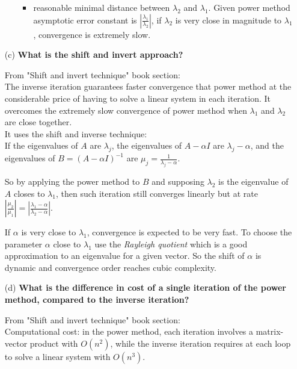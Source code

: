 \documentclass[unicode,11pt,a4paper,oneside,numbers=endperiod,openany]{scrartcl}
\begin{document}
\begin{enumerate}
\begin{itemize}
\begin{itemize}
                      \item
                            reasonable minimal distance between $\lambda_2$ and $\lambda_1$.
                            Given power method asymptotic error constant is $|\frac{\lambda_1}{\lambda_2}|$,
                            if $\lambda_2$ is very close in magnitude to $\lambda_1$, convergence is extremely slow.
                  \end{itemize}
        \end{itemize}

    \item[(c)] \textbf{What is the shift and invert approach?}

        From "Shift and invert technique" book section: \\
        The inverse iteration guarantees faster convergence that power method at the considerable price of having to solve a linear system in each iteration.
        It overcomes the extremely slow convergence of power method when $\lambda_1$ and $\lambda_2$ are close together. \\

        It uses the shift and inverse technique: \\
        If the eigenvalues of $A$ are $\lambda_j$, the eigenvalues of $A - \alpha I$ are $\lambda_j - \alpha$,
        and the eigenvalues of $B = (A - \alpha I)^{-1}$ are $\mu_j = \frac{1}{\lambda_j - \alpha}$.

        So by applying the power method to $B$ and supposing $\lambda_2$ is the eigenvalue of $A$ closes to $\lambda_1$,
        then such iteration still converges linearly but at rate $|\frac{\mu_2}{\mu_1}| = |\frac{\lambda_1 - \alpha}{\lambda_2 - \alpha}|$.

        If $\alpha$ is very close to $\lambda_1$, convergence is expected to be very fast.
        To choose the parameter $\alpha$ close to $\lambda_1$ use the \textit{Rayleigh quotient} which is a good approximation to an eigenvalue for a given vector.
        So the shift of $\alpha$ is dynamic and convergence order reaches cubic complexity.


    \item[(d)] \textbf{What is the difference in cost of a single iteration of the power method, compared to the inverse iteration?}

        From "Shift and invert technique" book section: \\

        Computational cost: in the power method, each iteration involves a matrix-vector product with $O(n^2)$,
        while the inverse iteration requires at each loop to solve a linear system with $O(n^3)$. \\


\end{enumerate}
\end{document}
